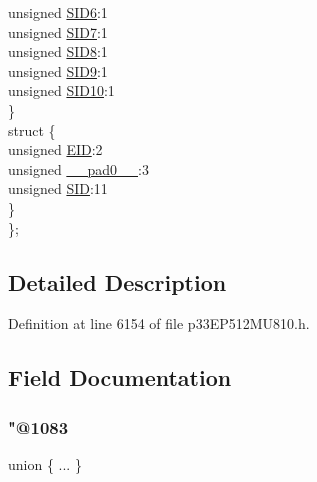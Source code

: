 \begin{DoxyCompactItemize}
\begin{tabbing}
\>\>unsigned \hyperlink{structtag_c2_r_x_f0_s_i_d_b_i_t_s_a70d70952133eb2389d5c326f9f0e8035}{SID6}:1\\
\>\>unsigned \hyperlink{structtag_c2_r_x_f0_s_i_d_b_i_t_s_a34097fb76decd431701fa2d86a22328e}{SID7}:1\\
\>\>unsigned \hyperlink{structtag_c2_r_x_f0_s_i_d_b_i_t_s_afe74894633244fdb0b0c01b4e8c522e7}{SID8}:1\\
\>\>unsigned \hyperlink{structtag_c2_r_x_f0_s_i_d_b_i_t_s_a33587704948067005c2a6a3ccc503c99}{SID9}:1\\
\>\>unsigned \hyperlink{structtag_c2_r_x_f0_s_i_d_b_i_t_s_a1a9084031c7f5fb16007feeebf0d8216}{SID10}:1\\
\>\} \\
\>struct \{\\
\>\>unsigned \hyperlink{structtag_c2_r_x_f0_s_i_d_b_i_t_s_ae80b378c9141f7c03e0b4e55b5f4b54d}{EID}:2\\
\>\>unsigned \hyperlink{structtag_c2_r_x_f0_s_i_d_b_i_t_s_adf71f3d8410c1f1dbbc96680a92c49af}{\_\_pad0\_\_}:3\\
\>\>unsigned \hyperlink{structtag_c2_r_x_f0_s_i_d_b_i_t_s_af88edf93b2fee2432665bd84f51287e4}{SID}:11\\
\>\} \\
\}; \\

\end{tabbing}\end{DoxyCompactItemize}


\subsection{Detailed Description}


Definition at line 6154 of file p33\+E\+P512\+M\+U810.\+h.



\subsection{Field Documentation}
\mbox{\label{structtag_c2_r_x_f0_s_i_d_b_i_t_s_a61baa1804dab32b9c1a86880b691853c}} 
\subsubsection{\texorpdfstring{"@1083}{@1083}}
{\footnotesize\ttfamily union \{ ... \} }

\mbox{\label{structtag_c2_r_x_f0_s_i_d_b_i_t_s_adf71f3d8410c1f1dbbc96680a92c49af}} 
